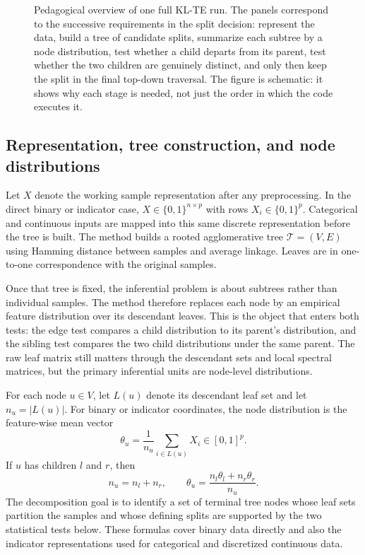 \begin{figure}[p]
\centering
\vspace*{\fill}
\resizebox{\textwidth}{!}{}
\caption{Pedagogical overview of one full KL-TE run. The panels correspond to
the successive requirements in the split decision: represent the data, build a
tree of candidate splits, summarize each subtree by a node distribution, test
whether a child departs from its parent, test whether the two children are
genuinely distinct, and only then keep the split in the final top-down
traversal. The figure is schematic: it shows why each stage is needed, not just
the order in which the code executes it.}
\label{fig:pipeline-overview}
\vspace*{\fill}
\end{figure}

\subsection{Representation, tree construction, and node distributions}

Let $X$ denote the working sample representation after any preprocessing. In
the direct binary or indicator case,
$X \in \{0,1\}^{n \times p}$ with rows $X_i \in \{0,1\}^p$. Categorical and
continuous inputs are mapped into this same discrete representation before the
tree is built. The method builds a rooted agglomerative tree
$\mathcal{T} = (V,E)$ using Hamming distance between samples and average
linkage. Leaves are in one-to-one correspondence with the original samples.

Once that tree is fixed, the inferential problem is about subtrees rather than
individual samples. The method therefore replaces each node by an empirical
feature distribution over its descendant leaves. This is the object that enters
both tests: the edge test compares a child distribution to its parent's
distribution, and the sibling test compares the two child distributions under
the same parent. The raw leaf matrix still matters through the descendant sets
and local spectral matrices, but the primary inferential units are node-level
distributions.

For each node $u \in V$, let $L(u)$ denote its descendant leaf set and let
$n_u = |L(u)|$. For binary or indicator coordinates, the node distribution is
the feature-wise mean vector
\begin{equation}
\theta_u = \frac{1}{n_u}\sum_{i \in L(u)} X_i \in [0,1]^p.
\end{equation}
If $u$ has children $l$ and $r$, then
\begin{equation}
n_u = n_l + n_r,
\qquad
\theta_u = \frac{n_l \theta_l + n_r \theta_r}{n_u}.
\end{equation}
The decomposition goal is to identify a set of terminal tree nodes whose leaf
sets partition the samples and whose defining splits are supported by the two
statistical tests below. These formulas cover binary data directly and also the
indicator representations used for categorical and discretized continuous data.

